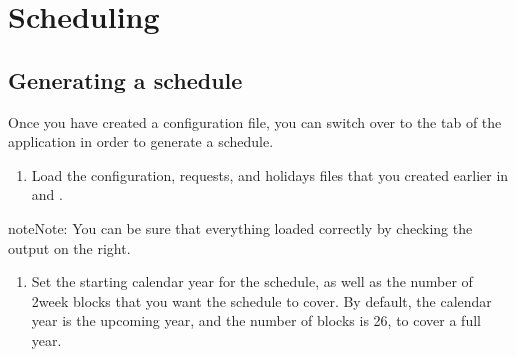 \documentclass[letterpaper,10pt,english]{sphinxmanual}
\begin{document}
\begin{figure}[H]
\centering

\end{figure}


\chapter{Scheduling}
\label{\detokenize{manual:scheduling}}

\section{Generating a schedule}
\label{\detokenize{manual:generating-a-schedule}}\label{\detokenize{manual:id3}}
Once you have created a configuration file, you can switch over to the
 tab of the application in order to generate a schedule.
\begin{enumerate}
%
\item {} 
Load the configuration, requests, and holidays files that you created
earlier in {\hyperref[\detokenize{manual:clinician-configuration}]{}} and {\hyperref[\detokenize{manual:requests-and-holidays}]{}}.

\end{enumerate}

\begin{sphinxadmonition}{note}{Note:}
You can be sure that everything loaded correctly by checking the output
on the right.
\end{sphinxadmonition}

\begin{figure}[H]
\centering

\end{figure}
\begin{enumerate}
%
\setcounter{enumi}{1}
\item {} 
Set the starting calendar year for the schedule, as well as the number
of 2\sphinxhyphen{}week blocks that you want the schedule to cover. By default, the calendar
year is the upcoming year, and the number of blocks is 26, to cover a full
year.

\end{enumerate}
\end{document}
